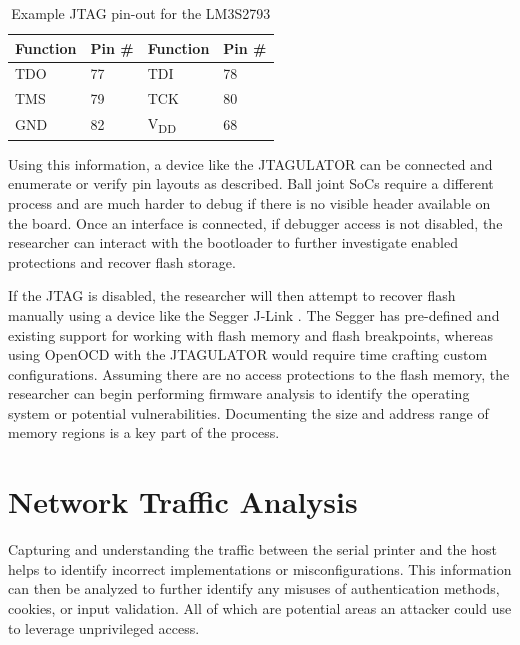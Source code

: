 \begin{table}[H]
  \centering
  \begin{tabular}{|p{3cm}|p{3cm}|p{3cm}|p{3cm}|}

    

    \hline\rowcolor{gray!30}
    \textbf{Function} & \textbf{Pin \#} & \textbf{Function} & \textbf{Pin \#}  \\
    \hline

    TDO & 77 & TDI & 78 \\
    \hline

    TMS & 79 & TCK & 80 \\
    \hline

    GND & 82 & V\textsubscript{DD} & 68 \\
    \hline

  \end{tabular}
  \caption{Example JTAG pin-out for the LM3S2793}
  \label{table:example_jtag_pinout}%
\end{table}

Using this information, a device like the JTAGULATOR \autocite{JTAGulator2023} can be connected and enumerate or verify pin layouts as described. Ball joint SoCs require a different process and are much harder to debug if there is no visible header available on the board. Once an interface is connected, if debugger access is not disabled, the researcher can interact with the bootloader to further investigate enabled protections and recover flash storage.

If the JTAG is disabled, the researcher will then attempt to recover flash manually using a device like the Segger J-Link \autocite{SEGGERJLinkDebug}. The Segger has pre-defined and existing support for working with flash memory and flash breakpoints, whereas using OpenOCD with the JTAGULATOR would require time crafting custom configurations. Assuming there are no access protections to the flash memory, the researcher can begin performing firmware analysis to identify the operating system or potential vulnerabilities. Documenting the size and address range of memory regions is a key part of the process.

\section{Network Traffic Analysis} \label{networkanalysis}

Capturing and understanding the traffic between the serial printer and the host helps to identify incorrect implementations or misconfigurations. This information can then be analyzed to further identify any misuses of authentication methods, cookies, or input validation. All of which are potential areas an attacker could use to leverage unprivileged access.

